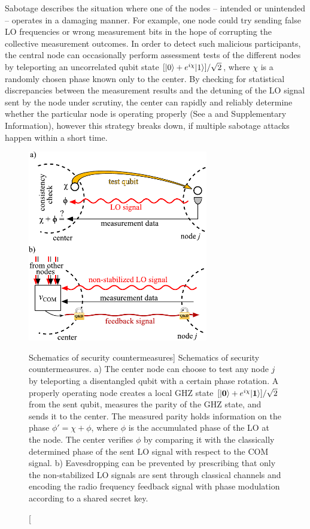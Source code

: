 Sabotage describes the situation where one of the nodes -- intended or
unintended -- operates in a damaging manner. For example, one node
could try sending false LO frequencies or wrong measurement bits in the hope of
corrupting the collective measurement outcomes. In order to detect such
malicious participants, the central node can occasionally perform assessment
tests of the different nodes by teleporting an uncorrelated qubit state
$[| 0 \rangle + e^{i\chi}| 1 \rangle]/\sqrt{2}$, where $\chi$ is a
 randomly chosen phase known only to the center. By checking for statistical
discrepancies between the measurement results and the detuning of the LO signal
sent by the node under scrutiny, the center can rapidly and reliably determine
whether the particular node is operating properly (See a
and Supplementary Information),
however this strategy breaks down, if multiple sabotage attacks
happen within a short time.
\begin{figure}
\centering
\includegraphics[width=0.7\textwidth]{./figs_Komar2014/fig4.pdf}
\caption
[Schematics of security countermeasures]
{
\label{fig:security}
Schematics of security countermeasures.
a) The center node can choose to test any node $j$ by teleporting a disentangled
qubit with a certain phase rotation. A properly operating node creates a local
GHZ state $[| \mathbf{0} \rangle + e^{i\chi}| \mathbf{1} \rangle]/\sqrt{2}$ from the
sent qubit,
 measures the parity of the GHZ state, and sends it to the center. The
measured parity holds information on the phase $\phi' = \chi + \phi$, where
$\phi$ is the accumulated phase of the LO at the node. The center verifies
$\phi$ by comparing it with the classically determined  phase of the sent LO
signal with respect to the COM signal.
b) Eavesdropping can be prevented by prescribing that only the non-stabilized LO
signals are sent through  classical channels and encoding the radio frequency
feedback signal with phase  modulation according to a shared secret key.
}
\end{figure}


